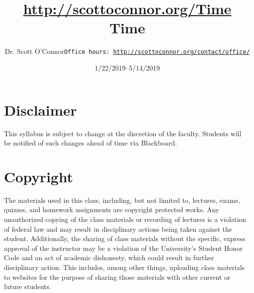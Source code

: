 \documentclass[article,oneside]{memoir}
\def\myauthor{Author}
\def\mytitle{Title}
\def\mycopyright{\myauthor}
\def\myweb{\href{http://scottoconnor.org/Time}{http://scottoconnor.org/Time}}
\def\myauthor{Dr. Scott O'Connor}
\def\mytitle{{\normalsize \myweb \newline} \HUGE Time}
\begin{document}
\setsansfont[Mapping=tex-text]{Myriad Pro} 
\setmonofont[Mapping=tex-text,Scale=0.8]{Georgia} 

\def\ind{\hangindent=1 true cm\hangafter=1 \noindent}
\def\labelitemi{$\cdot$}


\title{\LARGE \mytitle}     
\author{\Large\myauthor \newline \footnotesize\texttt{\noindent Office hours: \href{http://scottoconnor.org/contact/office/}{http://scottoconnor.org/contact/office/}}}
\date{1/22/2019--5/14/2019}


\maketitle




%
%

\section{Disclaimer}
 This syllabus is subject to change at the discretion of the faculty. Students will be notified of such changes ahead of time via Blackboard. 


\section{Copyright}
The materials used in this class, including, but not limited to, lectures, exams, quizzes, and homework assignments are copyright protected works.  Any unauthorized copying of the class materials or recording of lectures is a violation of federal law and may result in disciplinary actions being taken against the student.  Additionally, the sharing of class materials without the specific, express approval of the instructor may be a violation of the University's Student Honor Code and an act of academic dishonesty, which could result in further disciplinary action.  This includes, among other things, uploading class materials to websites for the purpose of sharing those materials with other current or future students. 
\end{document}
